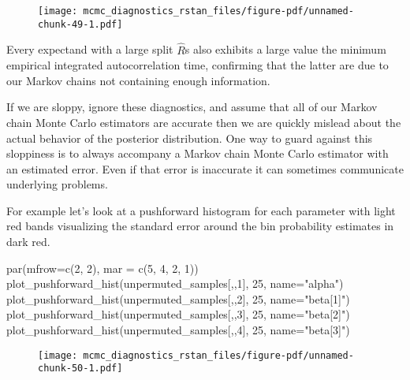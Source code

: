 \documentclass[
  letterpaper,
  DIV=11,
  numbers=noendperiod]{scrartcl}
\newenvironment{Shaded}{\begin{snugshade}}{\end{snugshade}}
\newcommand{\AttributeTok}[1]{\textcolor[rgb]{0.40,0.45,0.13}{#1}}
\newcommand{\DecValTok}[1]{\textcolor[rgb]{0.68,0.00,0.00}{#1}}
\newcommand{\FunctionTok}[1]{\textcolor[rgb]{0.28,0.35,0.67}{#1}}
\newcommand{\NormalTok}[1]{\textcolor[rgb]{0.00,0.23,0.31}{#1}}
\newcommand{\StringTok}[1]{\textcolor[rgb]{0.13,0.47,0.30}{#1}}
\begin{document}
\begin{figure}[H]

{\centering \texttt{[image: mcmc\_diagnostics\_rstan\_files/figure-pdf/unnamed-chunk-49-1.pdf]}

}

\end{figure}

Every expectand with a large split \(\hat{R}\)s also exhibits a large
value the minimum empirical integrated autocorrelation time, confirming
that the latter are due to our Markov chains not containing enough
information.

If we are sloppy, ignore these diagnostics, and assume that all of our
Markov chain Monte Carlo estimators are accurate then we are quickly
mislead about the actual behavior of the posterior distribution. One way
to guard against this sloppiness is to always accompany a Markov chain
Monte Carlo estimator with an estimated error. Even if that error is
inaccurate it can sometimes communicate underlying problems.

For example let's look at a pushforward histogram for each parameter
with light red bands visualizing the standard error around the bin
probability estimates in dark red.

\begin{Shaded}
\begin{Highlighting}[]
\FunctionTok{par}\NormalTok{(}\AttributeTok{mfrow=}\FunctionTok{c}\NormalTok{(}\DecValTok{2}\NormalTok{, }\DecValTok{2}\NormalTok{), }\AttributeTok{mar =} \FunctionTok{c}\NormalTok{(}\DecValTok{5}\NormalTok{, }\DecValTok{4}\NormalTok{, }\DecValTok{2}\NormalTok{, }\DecValTok{1}\NormalTok{))}
\FunctionTok{plot\_pushforward\_hist}\NormalTok{(unpermuted\_samples[,,}\DecValTok{1}\NormalTok{], }\DecValTok{25}\NormalTok{, }\AttributeTok{name=}\StringTok{"alpha"}\NormalTok{)}
\FunctionTok{plot\_pushforward\_hist}\NormalTok{(unpermuted\_samples[,,}\DecValTok{2}\NormalTok{], }\DecValTok{25}\NormalTok{, }\AttributeTok{name=}\StringTok{"beta[1]"}\NormalTok{)}
\FunctionTok{plot\_pushforward\_hist}\NormalTok{(unpermuted\_samples[,,}\DecValTok{3}\NormalTok{], }\DecValTok{25}\NormalTok{, }\AttributeTok{name=}\StringTok{"beta[2]"}\NormalTok{)}
\FunctionTok{plot\_pushforward\_hist}\NormalTok{(unpermuted\_samples[,,}\DecValTok{4}\NormalTok{], }\DecValTok{25}\NormalTok{, }\AttributeTok{name=}\StringTok{"beta[3]"}\NormalTok{)}
\end{Highlighting}
\end{Shaded}

\begin{figure}[H]

{\centering \texttt{[image: mcmc\_diagnostics\_rstan\_files/figure-pdf/unnamed-chunk-50-1.pdf]}

}

\end{figure}
\end{document}
